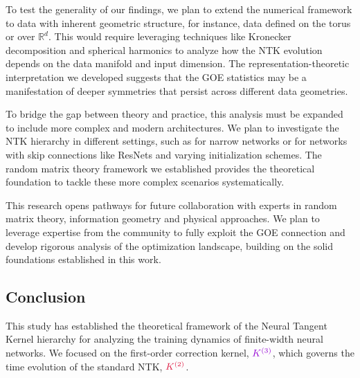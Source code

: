 \documentclass[a4paper]{article}
\theoremstyle{plain}
\theoremstyle{definition}
\theoremstyle{remark}
\begin{document}
\begin{tcolorbox}[colback=green!5,colframe=green!40!black,title={\textbf{Extensions to Structured Data}},enhanced,drop shadow]
To test the generality of our findings, we plan to extend the numerical framework to data with inherent geometric structure, for instance, data defined on the torus or over $\mathbb{R}^d$. This would require leveraging techniques like Kronecker decomposition and spherical harmonics to analyze how the NTK evolution depends on the data manifold and input dimension. The representation-theoretic interpretation we developed suggests that the GOE statistics may be a manifestation of deeper symmetries that persist across different data geometries.
\end{tcolorbox}

\begin{tcolorbox}[colback=orange!5,colframe=orange!40!black,title={\textbf{Modern Architecture Extensions}},enhanced,drop shadow]
To bridge the gap between theory and practice, this analysis must be expanded to include more complex and modern architectures. We plan to investigate the NTK hierarchy in different settings, such as for narrow networks or for networks with skip connections like ResNets and varying initialization schemes. The random matrix theory framework we established provides the theoretical foundation to tackle these more complex scenarios systematically.
\end{tcolorbox}

\begin{tcolorbox}[colback=yellow!5,colframe=yellow!40!black,title={\textbf{Future Collaboration Opportunities}},enhanced,drop shadow]
This research opens pathways for future collaboration with experts in random matrix theory, information geometry and physical approaches. We plan to leverage expertise from the community to fully exploit the GOE connection and develop rigorous analysis of the optimization landscape, building on the solid foundations established in this work.
\end{tcolorbox}



\newpage
\subsection{Conclusion}

This study has established the theoretical framework of the Neural Tangent Kernel hierarchy for analyzing the training dynamics of finite-width neural networks. We focused on the first-order correction kernel, $\textcolor{k3color}{K^{(3)}}$, which governs the time evolution of the standard NTK, $\textcolor{kernelcolor}{\textcolor{kernelcolor}{K}^{(2)}}$.
\end{document}

